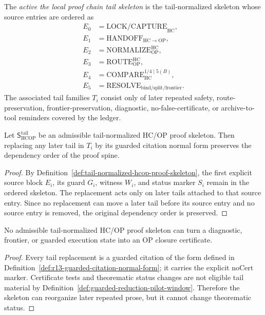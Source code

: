 \begin{definition}
\label{def:active-r01-r04-tail-skeleton}
The \emph{active the local proof chain tail skeleton} is the tail-normalized skeleton whose source entries are ordered as
\[
\begin{aligned}
E_0&=\mathrm{LOCK/CAPTURE}_{\mathrm{HC}},\\
E_1&=\mathrm{HANDOFF}_{\mathrm{HC}\to\mathrm{OP}},\\
E_2&=\mathrm{NORMALIZE}_{\mathrm{OP}}^{\mathrm{HC}},\\
E_3&=\mathrm{ROUTE}_{\mathrm{OP}}^{\mathrm{HC}},\\
E_4&=\mathrm{COMPARE}_{\mathrm{HC}}^{1/4\mid 5(B)},\\
E_5&=\mathrm{RESOLVE}_{\mathrm{bind/split/frontier}} .
\end{aligned}
\]
The associated tail families \(T_i\) consist only of later repeated safety, route-preservation, frontier-preservation, diagnostic, no-false-certificate, or archive-to-tool reminders covered by the ledger.
\end{definition}

\begin{lemma}
\label{lem:tail-skeleton-preserves-dependency-order}
Let \(\mathsf S_{\mathrm{HCOP}}^{\mathrm{tail}}\) be an admissible tail-normalized HC/OP proof skeleton. Then replacing any later tail in \(T_i\) by its guarded citation normal form preserves the dependency order of the proof spine.
\end{lemma}

\begin{proof}
By Definition~\ref{def:tail-normalized-hcop-proof-skeleton}, the first explicit source block \(E_i\), its guard \(G_i\), witness \(W_i\), and status marker \(S_i\) remain in the ordered skeleton. The replacement acts only on later tails attached to that source entry. Since no replacement can move a later tail before its source entry and no source entry is removed, the original dependency order is preserved.
\end{proof}

\begin{lemma}
\label{lem:tail-skeleton-does-not-create-certificates}
No admissible tail-normalized HC/OP proof skeleton can turn a diagnostic, frontier, or guarded execution state into an OP closure certificate.
\end{lemma}

\begin{proof}
Every tail replacement is a guarded citation of the form defined in Definition~\ref{def:r13-guarded-citation-normal-form}; it carries the explicit \(\mathrm{noCert}\) marker. Certificate tests and theorematic status changes are not eligible tail material by Definition~\ref{def:guarded-reduction-pilot-window}. Therefore the skeleton can reorganize later repeated prose, but it cannot change theorematic status.
\end{proof}

